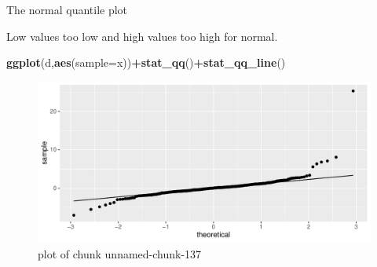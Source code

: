 \documentclass[ignorenonframetext,]{beamer}
\newenvironment{Shaded}{\begin{snugshade}}{\end{snugshade}}
\newcommand{\DataTypeTok}[1]{\textcolor[rgb]{0.13,0.29,0.53}{#1}}
\newcommand{\KeywordTok}[1]{\textcolor[rgb]{0.13,0.29,0.53}{\textbf{#1}}}
\newcommand{\NormalTok}[1]{#1}
\newcommand{\OperatorTok}[1]{\textcolor[rgb]{0.81,0.36,0.00}{\textbf{#1}}}
\begin{document}
\begin{frame}[fragile]{The normal quantile plot}
\protect\hypertarget{the-normal-quantile-plot-5}{}

Low values too low and high values too high for normal.

\begin{Shaded}
\begin{Highlighting}[]
\KeywordTok{ggplot}\NormalTok{(d,}\KeywordTok{aes}\NormalTok{(}\DataTypeTok{sample=}\NormalTok{x))}\OperatorTok{+}\KeywordTok{stat_qq}\NormalTok{()}\OperatorTok{+}\KeywordTok{stat_qq_line}\NormalTok{()}
\end{Highlighting}
\end{Shaded}

\begin{figure}
\centering
\includegraphics{figure/unnamed-chunk-137-1.pdf}
\caption{plot of chunk unnamed-chunk-137}
\end{figure}

\end{frame}
\end{document}
